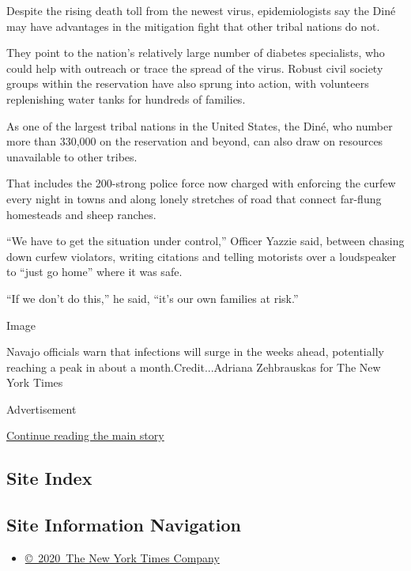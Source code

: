 Despite the rising death toll from the newest virus, epidemiologists say
the Diné may have advantages in the mitigation fight that other tribal
nations do not.

They point to the nation's relatively large number of diabetes
specialists, who could help with outreach or trace the spread of the
virus. Robust civil society groups within the reservation have also
sprung into action, with volunteers replenishing water tanks for
hundreds of families.

As one of the largest tribal nations in the United States, the Diné, who
number more than 330,000 on the reservation and beyond, can also draw on
resources unavailable to other tribes.

That includes the 200-strong police force now charged with enforcing the
curfew every night in towns and along lonely stretches of road that
connect far-flung homesteads and sheep ranches.

``We have to get the situation under control,'' Officer Yazzie said,
between chasing down curfew violators, writing citations and telling
motorists over a loudspeaker to ``just go home'' where it was safe.

``If we don't do this,'' he said, ``it's our own families at risk.''

Image

Navajo officials warn that infections will surge in the weeks ahead,
potentially reaching a peak in about a month.Credit...Adriana
Zehbrauskas for The New York Times

Advertisement

\protect\hyperlink{after-bottom}{Continue reading the main story}

\hypertarget{site-index}{%
\subsection{Site Index}\label{site-index}}

\hypertarget{site-information-navigation}{%
\subsection{Site Information
Navigation}\label{site-information-navigation}}

\begin{itemize}
\tightlist
\item
  \href{https://help.nytimes3xbfgragh.onion/hc/en-us/articles/115014792127-Copyright-notice}{©~2020~The
  New York Times Company}
\end{itemize}

